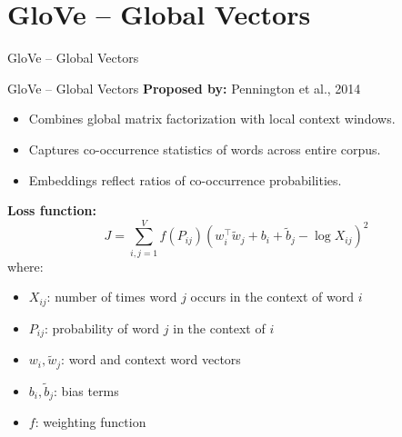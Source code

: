 \section{GloVe – Global Vectors}
\begin{frame}{}
    \LARGE GloVe – Global Vectors
\end{frame}

\begin{frame}[allowframebreaks]{GloVe – Global Vectors}
    \textbf{Proposed by:} Pennington et al., 2014

    \begin{itemize}
        \setlength{\itemsep}{1em}
        \item Combines global matrix factorization with local context windows.
        \item Captures co-occurrence statistics of words across entire corpus.
        \item Embeddings reflect ratios of co-occurrence probabilities.
    \end{itemize}

\framebreak
    \textbf{Loss function:}
    \[
        J = \sum_{i,j=1}^{V} f(P_{ij}) \left( w_i^\top \tilde{w}_j + b_i + \tilde{b}_j - \log X_{ij} \right)^2
    \]
    where:
    \begin{itemize}
        \setlength{\itemsep}{1em}
        \item $X_{ij}$: number of times word $j$ occurs in the context of word $i$
        \item $P_{ij}$: probability of word $j$ in the context of $i$
        \item $w_i, \tilde{w}_j$: word and context word vectors
        \item $b_i, \tilde{b}_j$: bias terms
        \item $f$: weighting function
    \end{itemize}
\framebreak
    \begin{figure}
        \centering
    \end{figure}
\framebreak
    \begin{figure}
        \centering
    \end{figure}
\end{frame}